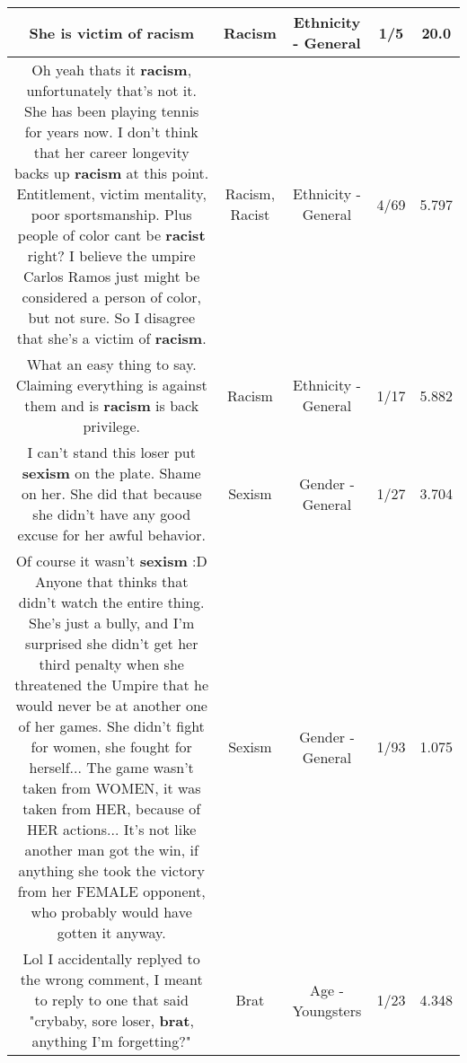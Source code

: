 \documentclass[11pt]{article}
\newlength\mylength
\begin{document}
\begin{center}
\begin{longtable}{|C{.65\mylength}|C{.30\mylength}|C{.12\mylength}|C{.12\mylength}|C{.12\mylength}|}
  \small She is victim of racism\normalsize   & Racism & Ethnicity - General & 1/5 & 20.0 \\  \hline
  \small Oh yeah thats it \textbf{racism}, unfortunately that's not it. She has been playing tennis for years now. I don't think that her career longevity backs up \textbf{racism} at this point. Entitlement, victim mentality, poor sportsmanship. Plus people of color cant be \textbf{racist} right? I believe the umpire Carlos Ramos just might be considered a person of color, but not sure. So I disagree that she's a victim of \textbf{racism}.\normalsize   & Racism, Racist & Ethnicity - General & 4/69 & 5.797 \\  \hline
  \small What an easy thing to say. Claiming everything is against them and is \textbf{racism} is back privilege.\normalsize   & Racism & Ethnicity - General & 1/17 & 5.882 \\  \hline
  \small I can't stand this loser put \textbf{sexism} on the plate. Shame on her. She did that because she didn't have any good excuse for her awful behavior.\normalsize   & Sexism & Gender - General & 1/27 & 3.704 \\  \hline
  \small Of course it wasn't \textbf{sexism} :D Anyone that thinks that didn't watch the entire thing. She's just a bully, and I'm surprised she didn't get her third penalty when she threatened the Umpire that he would never be at another one of her games. She didn't fight for women, she fought for herself... The game wasn't taken from WOMEN, it was taken from HER, because of HER actions... It's not like another man got the win, if anything she took the victory from her FEMALE opponent, who probably would have gotten it anyway.\normalsize   & Sexism & Gender - General & 1/93 & 1.075 \\  \hline
  \small Lol I accidentally replyed to the wrong comment, I meant to reply to one that said "crybaby, sore loser, \textbf{brat}, anything I'm forgetting?"\normalsize   & Brat & Age - Youngsters & 1/23 & 4.348 \\  \hline

\end{longtable}
\end{center}
\end{document}
